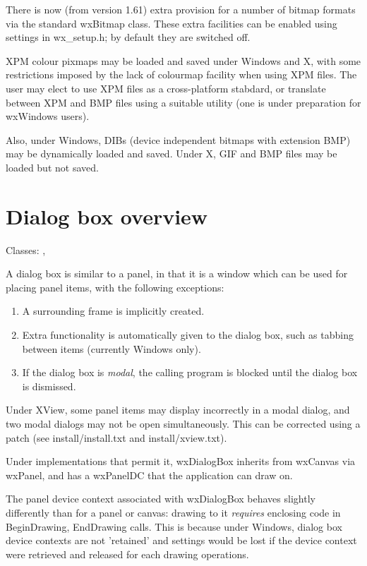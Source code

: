 There is now (from version 1.61) extra provision for a number of bitmap
formats via the standard wxBitmap class. These extra facilities can
be enabled using settings in wx\_setup.h; by default they are switched off.

XPM colour pixmaps may be loaded and saved under Windows and X, with
some restrictions imposed by the lack of colourmap facility when
using XPM files. The user may elect to use XPM files as a cross-platform
stabdard, or translate between XPM and BMP files using a suitable
utility (one is under preparation for wxWindows users).

Also, under Windows, DIBs (device independent bitmaps with extension BMP)
may be dynamically loaded and saved. Under X, GIF and BMP files may be
loaded but not saved.

\section{Dialog box overview}\label{wxdialogboxoverview}

Classes: , 

A dialog box is similar to a panel, in that it is a window which can
be used for placing panel items, with the following exceptions:

\begin{enumerate}
\item A surrounding frame is implicitly created.
\item Extra functionality is automatically given to the dialog box,
  such as tabbing between items (currently Windows only).
\item If the dialog box is {\it modal}, the calling program is blocked
  until the dialog box is dismissed.
\end{enumerate}

Under XView, some panel items may display incorrectly in a modal dialog,
and two modal dialogs may not be open simultaneously. This can
be corrected using a patch (see install/install.txt and install/xview.txt).

Under implementations that permit it, wxDialogBox inherits from wxCanvas
via wxPanel, and has a wxPanelDC that the application can draw on.

The panel device context associated with wxDialogBox behaves slightly
differently than for a panel or canvas: drawing to it {\it requires} enclosing
code in BeginDrawing, EndDrawing calls. This is because under Windows, dialog
box device contexts are not 'retained' and settings would be lost if the
device context were retrieved and released for each drawing operations.

